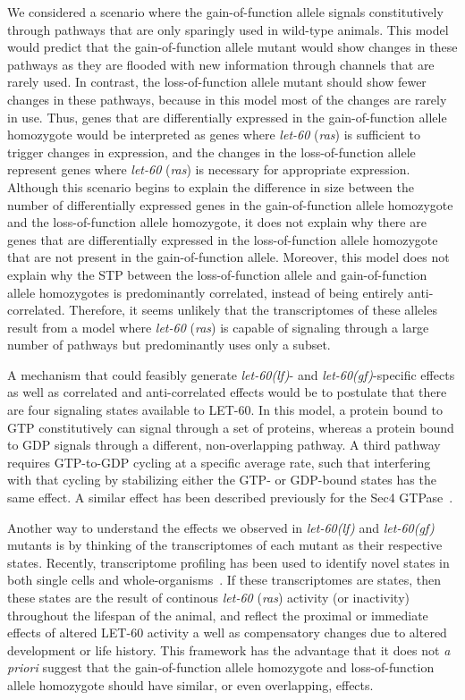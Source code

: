 \documentclass[10pt, onecolumn]{article}
\newcommand{\gf}{gain-of-function allele}
\newcommand{\lf}{loss-of-function allele}
\newcommand{\gene}[1]{\mbox{\emph{#1}}}
\newcommand{\protein}[1]{\mbox{\uppercase{#1}}}
\newcommand{\ras}{\gene{let-60} (\emph{ras})}
\newcommand{\rasp}{\protein{let-60}}
\newcommand{\letgf}{\gene{let-60(gf)}}
\newcommand{\letlf}{\gene{let-60(lf)}}
\begin{document}
We considered a scenario where the \gf{} signals constitutively through pathways
that are only sparingly used in wild-type animals. This model would predict that
the \gf{} mutant would show changes in these pathways as they are flooded with
new information through channels that are rarely used. In contrast, the \lf{}
mutant should show fewer changes in these pathways, because in this model most
of the changes are rarely in use. Thus, genes that are differentially expressed
in the \gf{} homozygote would be interpreted as genes where \ras{} is sufficient
to trigger changes in expression, and the changes in the \lf{} represent genes
where \ras{} is necessary for appropriate expression. Although this scenario
begins to explain the difference in size between the number of differentially
expressed genes in the \gf{} homozygote and the \lf{} homozygote, it does not
explain why there are genes that are differentially expressed in the \lf{}
homozygote that are not present in the \gf{}. Moreover, this model does not
explain why the STP between the \lf{} and \gf{} homozygotes is predominantly
correlated, instead of being entirely anti-correlated. Therefore, it seems
unlikely that the transcriptomes of these alleles result from a model where
\ras{} is capable of signaling through a large number of pathways but
predominantly uses only a subset.

A mechanism that could feasibly generate \letlf{}- and \letgf{}-specific effects
as well as correlated and anti-correlated effects would be to postulate that
there are four signaling states available to \rasp{}. In this model, a protein
bound to GTP constitutively can signal through a set of proteins, whereas a
protein bound to GDP signals through a different, non-overlapping pathway. A
third pathway requires GTP-to-GDP cycling at a specific average rate, such that
interfering with that cycling by stabilizing either the GTP- or GDP-bound states
has the same effect. A similar effect has been described previously for the Sec4
GTPase~\cite{}.

Another way to understand the effects we observed in \letlf{} and \letgf{}
mutants is by thinking of the transcriptomes of each mutant as their respective
states. Recently, transcriptome profiling has been used to identify novel states
in both single cells and whole-organisms~\cite{Villani2017}.
If these transcriptomes are states, then these states are the result of continous
\ras{} activity (or inactivity) throughout the lifespan of the animal, and
reflect the proximal or immediate effects of altered \rasp{} activity a well as
compensatory changes due to altered development or life history. This framework
has the advantage that it does not \emph{a priori} suggest that the \gf{} homozygote
and \lf{} homozygote should have similar, or even overlapping, effects.
\end{document}
